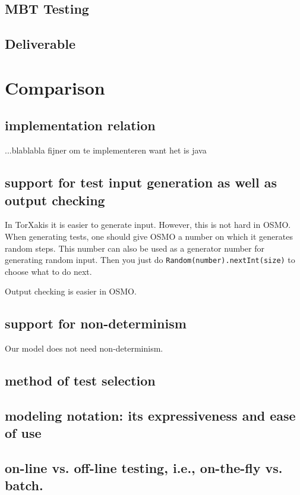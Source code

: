 \documentclass[11pt,a4paper]{article}
\begin{document}
\subsection{MBT Testing}

\subsection{Deliverable}


\section{Comparison}
\subsection{implementation relation}
...blablabla fijner om te implementeren want het is java
\subsection{support for test input generation as well as output checking}
In TorXakis it is easier to generate input. However, this is not hard in OSMO. When generating tests, one should give OSMO a number on which it generates random steps. This number can also be used as a generator number for generating random input. Then you just do \verb|Random(number).nextInt(size)| to choose what to do next.


Output checking is easier in OSMO. 
\subsection{support for non-determinism}
Our model does not need non-determinism.
\subsection{method of test selection}
\subsection{modeling notation: its expressiveness and ease of use}
\subsection{on-line vs. off-line testing, i.e., on-the-fly vs. batch.}
\end{document}
